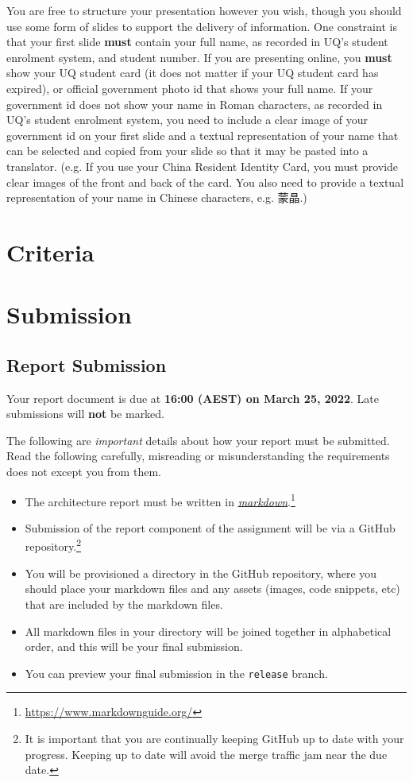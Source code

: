 \documentclass{csse4400}
\begin{document}
\begin{CJK*}{UTF8}{gbsn}
You are free to structure your presentation however you wish, though you should use some form of slides to support the delivery of information.
One constraint is that your first slide \textbf{must} contain your full name, as recorded in UQ's student enrolment system, and student number.
If you are presenting online, you \textbf{must} show your UQ student card (it does not matter if your UQ student card has expired),
or official government photo id that shows your full name. If your government id does not show your name in Roman characters,
as recorded in UQ's student enrolment system, you need to include a clear image of your government id on your first slide and a textual
representation of your name that can be selected and copied from your slide so that it may be pasted into a translator.
(e.g. If you use your China Resident Identity Card, you must provide clear images of the front and back
of the card. You also need to provide a textual representation of your name in Chinese characters, e.g. 蒙晶.)
\end{CJK*}

\section{Criteria}

\section{Submission}
\subsection{Report Submission}
Your report document is due at \textbf{16:00 (AEST) on March 25, 2022}. Late submissions will \textbf{not} be marked.

The following are \textsl{important} details about how your report must be submitted.
Read the following carefully, misreading or misunderstanding the requirements does not except you from them.

\begin{itemize}
    \item The architecture report must be written in \href{https://www.markdownguide.org/}{\textsl{markdown}}.\footnote{\url{https://www.markdownguide.org/}}
    \item Submission of the report component of the assignment will be via a GitHub repository.\footnote{It is important that you are continually keeping GitHub up to date with your progress.
        Keeping up to date will avoid the merge traffic jam near the due date.}
    \item You will be provisioned a directory in the GitHub repository,
        where you should place your markdown files and any assets (images, code snippets, etc) that are included by the markdown files.
    \item All markdown files in your directory will be joined together in alphabetical order,
        and this will be your final submission.
    \item You can preview your final submission in the \texttt{release} branch.
\end{itemize}
\end{document}
